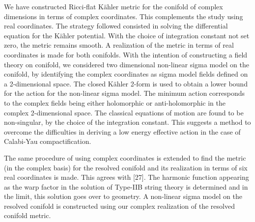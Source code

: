 \documentclass[a4paper,12pt]{article}
\begin{document}
\vspace{0.5cm}

{}

\vspace{0.5cm}

We have constructed Ricci-flat K\"{a}hler metric for the conifold of complex 
dimensions \coordHE{} in terms of complex 
coordinates.  
This complements the study using real coordinates. The strategy 
followed consisted in solving the differential equation for the K\"{a}hler 
potential. With the choice of integration constant \coordHE{} not set zero, the 
metric remains smooth. A realization of the metric 
in terms of real coordinates is made for both \coordHE{} conifolds. 
With the intention 
of constructing a field theory on conifold, we considered 
two dimensional non-linear sigma 
model on the conifold, by identifying the  complex coordinates as 
sigma model fields defined on a 2-dimensional space.  
The closed K\"{a}hler 2-form is used to obtain a lower bound for the 
action for the non-linear sigma model. The minimum action 
corresponds to the complex fields being either holomorphic or 
anti-holomorphic in the complex 2-dimensional space. The classical equations 
of motion are found to be non-singular, by the choice of the integration 
constant. This suggests a method to overcome the difficulties in deriving 
a low energy effective action in the case of Calabi-Yau compactification. 

\vspace{0.5cm}


The same procedure of using complex coordinates is extended to find the 
metric (in the complex basis) for the \coordHE{} resolved conifold 
and its realization  
in terms of six real coordinates is made. This agrees with [27]. The 
harmonic function appearing as the warp factor in the solution of Type-IIB 
string theory is determined and in the \coordHE{} limit,  
this solution goes over to  \coordHE{} geometry. A non-linear sigma model on the resolved conifold 
is constructed using our complex realization of the resolved conifold 
metric.  

\vspace{0.5cm}
\end{document}
